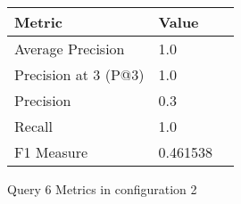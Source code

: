 \begin{figure}[H]
\begin{center}
\begin{tabular}{lll}
\toprule
{}                      Metric &         Value \\
\midrule
     Average Precision &       1.0 \\
  Precision at 3 (P@3) &       1.0 \\
             Precision &       0.3 \\
                Recall &       1.0 \\
            F1 Measure &  0.461538 \\
\bottomrule
\end{tabular}
\end{center}
\caption{Query 6 Metrics in configuration 2}
\label{fig:query_6_metrics_config_2}
\end{figure}